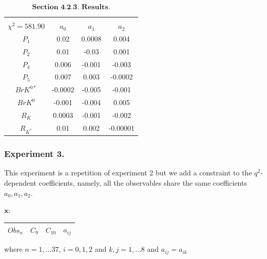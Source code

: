 \documentclass[a4paper,fleqn]{cas-dc}
\begin{document}
\begin{table}
	\begin{tabular}{ |c|c|c|c|  } 
		\hline
		\small
		\makecell{\(C_9 = 0.38\), \(C_{10} = 5.9\) \\ \(\chi^2 = 581.90 \)}
		\normalsize
		& \textbf{\(a_0\)} & \textbf{\(a_1\)} & \textbf{\(a_2\)}\\
		\hline
		\(P_1\) & 0.02 & 0.0008 &  0.004 \\
		\hline
		\(P_2\) & 0.01 & -0.03 & 0.001 \\	
		\hline
		\(P_4\) & 0.006 & -0.001 &	-0.003 \\
		\hline
		\(P_5\) & 0.007 &   0.003 &   -0.0002 \\		
		\hline
		\(BrK^{0*}\) & -0.0002 & -0.005 & -0.001 \\		
		\hline
		\(BrK^{0}\) & -0.001 & -0.004 & 0.005 \\		
		\hline	
		\(R_{K}\) & 0.0003 & -0.001 & -0.002 \\
		\hline	
		\(R_{K^*}\) & 0.01 & 0.002 & -0.00001 \\		
		\hline
		
		
	\end{tabular}
	\caption{\label{tab:GAN2Results} \(\textbf{Section 4.2.3. Results.}\) }
\end{table}

\subsubsection{Experiment 3. }
This experiment is a repetition of experiment 2 but we add a constraint to the \(q^2\)-dependent coefficients, namely, all the observables share the same coefficients \(a_0,a_1,a_2\). 
\begin{center}
	\(\boldsymbol{x:} \)
	\quad
	\begin{tabular}{ |c|c|c|c|  } 
		\hline
		\(Obs_n \)  & \(C_9\) & \(C_{10}\) & \(a_{ij}\)\\
		
		\hline
	\end{tabular}
\end{center}
where \(n=1,...37\), \(i=0,1,2\) and  \(k,j=1,...8\) and \(a_{ij} = a_{ik}\)
\end{document}
